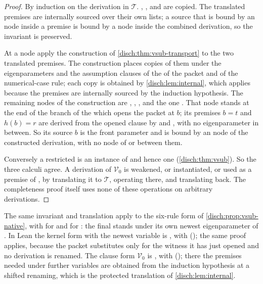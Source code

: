 \begin{proof}
By induction on the derivation in $\mathcal T$. ,
,  and  are copied. The
translated premises are internally sourced over their own lists; a source
that is bound by an  node inside a premise is bound by a
node inside the combined derivation, so the invariant is preserved.

At a  node apply the construction of
\cref{disch:thm:vsub-transport} to the two translated premises. The
construction places copies of them under the eigenparameters and the
assumption clauses of the  of the packet and of the
numerical-case rule; each copy is obtained by \cref{disch:lem:internal},
which applies because the premises are internally sourced by the induction
hypothesis. The remaining nodes of the construction are ,
, ,  and the one
. That node stands at the end of the branch of the
 which opens the packet at $b$; its premises $b=t$ and
$h(b)=r$ are derived from the opened clause by  and
, with no eigenparameter in between. So its source $b$ is
the front parameter and is bound by an  node of the
constructed derivation, with no node of  or
 between them.

Conversely a restricted  is an instance of 
and hence one  (\cref{disch:thm:vsub}). So the three calculi
agree. A derivation of $\mathcal V_0$ is weakened, or instantiated, or
used as a premise of , by translating it to $\mathcal T$,
operating there, and translating back. The completeness proof itself uses
none of these operations on arbitrary derivations.
\end{proof}

The same invariant and translation apply to the six-rule form of
\cref{disch:prop:vsub-native}, with  for  and
 for : the final  stands under
its own newest eigenparameter of . In Lean the kernel form
with the newest variable is , with 
(); the same proof applies, because the packet
substitutes only for the witness it has just opened and no derivation is
renamed. The clause form $\mathcal V_0$ is , with
 (); there the premises
needed under further variables are obtained from the induction hypothesis
at a shifted renaming, which is the protected translation of
\cref{disch:lem:internal}.

